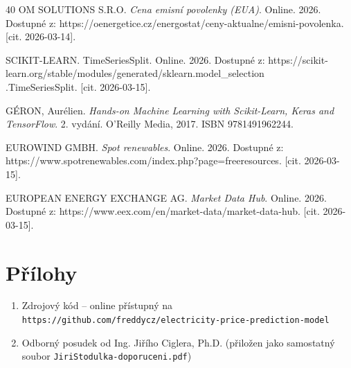 \documentclass[a4paper]{article}
\begin{document}
\begin{thebibliography}{40}
 OM SOLUTIONS S.R.O. \textit{Cena emisní povolenky (EUA)}. Online. 2026. Dostupné z: https://oenergetice.cz/energostat/ceny-aktualne/emisni-povolenka. [cit. 2026-03-14].

 SCIKIT-LEARN. TimeSeriesSplit. Online. 2026. Dostupné z: https://scikit-learn.org/stable/modules/generated/sklearn.model\_selection\\.TimeSeriesSplit. [cit. 2026-03-15].

 GÉRON, Aurélien. \textit{Hands-on Machine Learning with Scikit-Learn, Keras and TensorFlow}. 2. vydání. O'Reilly Media, 2017. ISBN 9781491962244.

 EUROWIND GMBH. \textit{Spot renewables}. Online. 2026. Dostupné z: https://www.spotrenewables.com/index.php?page=freeresources. [cit. 2026-03-15].

 EUROPEAN ENERGY EXCHANGE AG. \textit{Market Data Hub}. Online. 2026. Dostupné z: https://www.eex.com/en/market-data/market-data-hub. [cit. 2026-03-15].

\end{thebibliography}

\newpage
\listoffigures
\lstlistoflistings

\section*{Přílohy}
\begin{enumerate}
  \item Zdrojový kód -- online přístupný na \\ \texttt{https://github.com/freddycz/electricity-price-prediction-model}
  \item \label{itm:posudek} Odborný posudek od Ing. Jiřího Ciglera, Ph.D. (přiložen jako samostatný soubor \texttt{JiriStodulka-doporuceni.pdf}) 
\end{enumerate}
\end{document}
